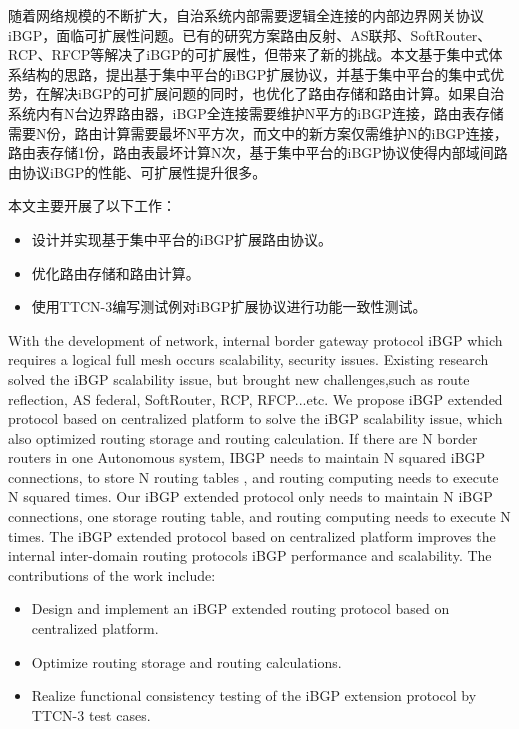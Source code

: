 \begin{cabstract}
  随着网络规模的不断扩大，自治系统内部需要逻辑全连接的内部边界网关协议iBGP，面临可扩展性问题。已有的研究方案路由反射、AS联邦、SoftRouter、RCP、RFCP等解决了iBGP的可扩展性，但带来了新的挑战。本文基于集中式体系结构的思路，提出基于集中平台的iBGP扩展协议，并基于集中平台的集中式优势，在解决iBGP的可扩展问题的同时，也优化了路由存储和路由计算。如果自治系统内有N台边界路由器，iBGP全连接需要维护N平方的iBGP连接，路由表存储需要N份，路由计算需要最坏N平方次，而文中的新方案仅需维护N的iBGP连接，路由表存储1份，路由表最坏计算N次，基于集中平台的iBGP协议使得内部域间路由协议iBGP的性能、可扩展性提升很多。

  本文主要开展了以下工作：
  \begin{itemize}
    \item 设计并实现基于集中平台的iBGP扩展路由协议。
    \item 优化路由存储和路由计算。
    \item 使用TTCN-3编写测试例对iBGP扩展协议进行功能一致性测试。
  \end{itemize}

\end{cabstract}


\begin{eabstract}
   With the development of network, internal border gateway protocol iBGP which requires a logical full mesh occurs scalability, security issues. Existing research solved the iBGP scalability issue, but brought new challenges,such as route reflection, AS federal, SoftRouter, RCP, RFCP...etc. We propose iBGP extended protocol based on centralized platform to solve the iBGP scalability issue, which also optimized routing storage and routing calculation. If there are N border routers in one Autonomous system, IBGP needs to maintain N squared iBGP connections, to store N routing tables , and routing computing needs to execute N squared times. Our iBGP extended protocol only needs to maintain N iBGP connections, one storage routing table, and routing computing needs to execute N times. The iBGP extended protocol based on centralized platform improves the internal inter-domain routing protocols iBGP performance and scalability. The contributions of the work include:

   \begin{itemize}
    \item Design and implement an iBGP extended routing protocol based on centralized platform.
    \item Optimize routing storage and routing calculations.
    \item Realize functional consistency testing of the iBGP extension protocol by TTCN-3 test cases.
  \end{itemize}



\end{eabstract}




